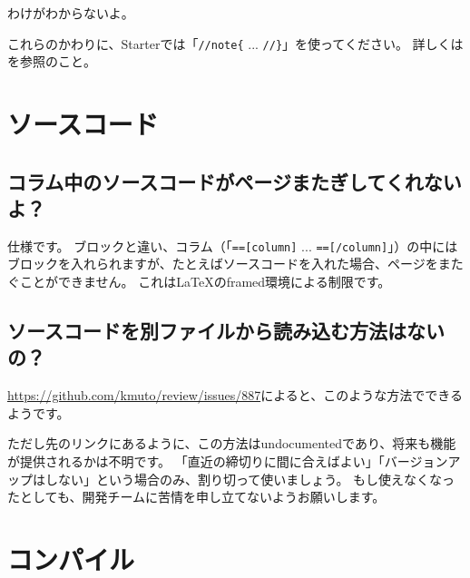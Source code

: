 \begin{reviewminicolumn}

\end{reviewminicolumn}
\vspace*{\baselineskip}

わけがわからないよ。

これらのかわりに、Starterでは「\texttt{//note\{} ... \texttt{//\}}」を使ってください。
詳しくはを参照のこと。

\section{ソースコード}
\label{sec:2-4}

\subsection{コラム中のソースコードがページまたぎしてくれないよ？}
\label{sec:2-4-1}

仕様です。
ブロックと違い、コラム（「\texttt{==[column]} ... \texttt{==[/column]}」）の中にはブロックを入れられますが、たとえばソースコードを入れた場合、ページをまたぐことができません。
これは\LaTeX{}のframed環境による制限です。

\subsection{ソースコードを別ファイルから読み込む方法はないの？}
\label{sec:2-4-2}

\url{https://github.com/kmuto/review/issues/887}によると、このような方法でできるようです。

\begin{starterprogram}\end{starterprogram}

ただし先のリンクにあるように、この方法はundocumentedであり、将来も機能が提供されるかは不明です。
「直近の締切りに間に合えばよい」「バージョンアップはしない」という場合のみ、割り切って使いましょう。
もし使えなくなったとしても、開発チームに苦情を申し立てないようお願いします。

\section{コンパイル}
\label{sec:2-5}

